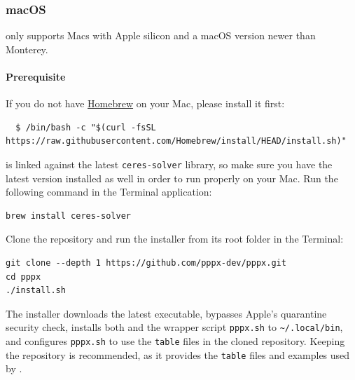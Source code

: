 \subsubsection{macOS}
\label{sec:installation_macos}

\pppx{} only supports Macs with Apple silicon and a macOS version newer than Monterey.


\paragraph{Prerequisite}

If you do not have \href{https://brew.sh/}{Homebrew} on your Mac, please install it first:

\begin{verbatim}
  $ /bin/bash -c "$(curl -fsSL https://raw.githubusercontent.com/Homebrew/install/HEAD/install.sh)"
\end{verbatim} 

\pppx{} is linked against the latest \texttt{ceres-solver} library, so make sure you have the
latest version installed as well in order to run \pppx{} properly on your Mac.
Run the following command in the Terminal application:

\begin{verbatim}
brew install ceres-solver
\end{verbatim}


Clone the repository and run the installer from its root folder in the Terminal:

\begin{verbatim}
git clone --depth 1 https://github.com/pppx-dev/pppx.git
cd pppx
./install.sh
\end{verbatim}

The installer downloads the latest \pppx{} executable, bypasses Apple's quarantine
security check, installs both \pppx{} and the wrapper script \texttt{pppx.sh} to
\verb|~/.local/bin|, and configures \texttt{pppx.sh} to use the \texttt{table} files in
the cloned repository. Keeping the repository is recommended, as it provides the
\texttt{table} files and examples used by \pppx{}.

